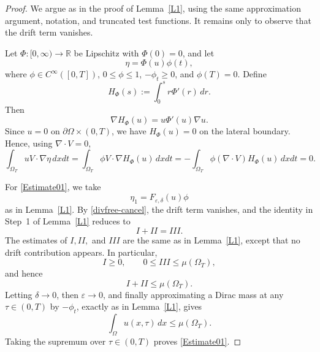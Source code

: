 \documentclass{amsart}
\numberwithin{equation}{section}
\begin{document}
\begin{proof}
We argue as in the proof of Lemma~\ref{L1}, using the same approximation
argument, notation, and truncated test functions. It remains only to observe
that the drift term vanishes.

Let $\Phi:[0,\infty)\to\mathbb{R}$ be Lipschitz with $\Phi(0)=0$, and let
\[
\eta=\Phi(u)\phi(t),
\]
where $\phi\in C^\infty([0,T])$, $0\le\phi\le1$, $-\phi_t\ge0$, and
$\phi(T)=0$. Define
\[
H_\Phi(s):=\int_0^s r\Phi'(r)\,dr.
\]
Then
\[
\nabla H_\Phi(u)=u\Phi'(u)\nabla u.
\]
Since $u=0$ on $\partial\Omega\times(0,T)$, we have $H_\Phi(u)=0$ on the
lateral boundary. Hence, using $\nabla\cdot V=0$,
\begin{equation}\label{divfree-cancel}
\int_{\Omega_T}uV\cdot\nabla\eta\,dxdt
=
\int_{\Omega_T}\phi V\cdot\nabla H_\Phi(u)\,dxdt
=
-\int_{\Omega_T}\phi(\nabla\cdot V)H_\Phi(u)\,dxdt
=0.
\end{equation}

For \eqref{Estimate01}, we take
\[
\eta_1=F_{\varepsilon,\delta}(u)\phi
\]
as in Lemma~\ref{L1}. By \eqref{divfree-cancel}, the drift term vanishes,
and the identity in Step~1 of Lemma~\ref{L1} reduces to
\[
I+II=III.
\]
The estimates of $I,II,$ and $III$ are the same as in Lemma~\ref{L1}, except
that no drift contribution appears. 
In particular,
\[
I\ge0,\qquad 0\le III\le\mu(\Omega_T),
\]
and hence
\[
I+II\le\mu(\Omega_T).
\]
Letting $\delta\to0$, then $\varepsilon\to0$, and finally approximating a
Dirac mass at any $\tau\in(0,T)$ by $-\phi_t$, exactly as in
Lemma~\ref{L1}, gives
\[
\int_\Omega u(x,\tau)\,dx\le\mu(\Omega_T).
\]
Taking the supremum over $\tau\in(0,T)$ proves \eqref{Estimate01}.


\end{proof}
\end{document}
